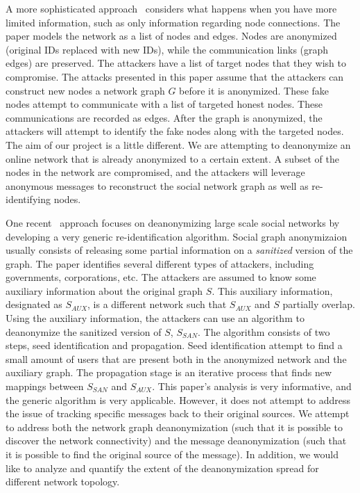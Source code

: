 \documentclass[10pt, twocolumn]{article}
\begin{document}
A more sophisticated approach~\cite{backstrom2007wherefore} considers what happens when you have more limited information, such as only information regarding node connections. The paper models the network as a list of nodes and edges. Nodes are anonymized (original IDs replaced with new IDs), while the communication links (graph edges) are preserved. The attackers have a list of target nodes that they wish to compromise.
The attacks presented in this paper assume that the attackers can construct new nodes a network graph $G$ before it is anonymized. These fake nodes attempt to communicate with a list of targeted honest nodes. These communications are recorded as edges. After the graph is anonymized, the attackers will attempt to identify the fake nodes along with the targeted nodes. 
The aim of our project is a little different. We are attempting to deanonymize an online network that is already anonymized to a certain extent. A subset of the nodes in the network are compromised, and the attackers will leverage anonymous messages to reconstruct the social network graph as well as re-identifying nodes. 

One recent~\cite{narayanan2009anonymizing} approach focuses on deanonymizing large scale social networks by developing a very generic re-identification algorithm. Social graph anonymizaion usually consists of releasing some partial information on a \emph{sanitized} version of the graph. 
The paper identifies several different types of attackers, including governments, corporations, etc. The attackers are assumed to know some auxiliary information about the original graph $S$. This auxiliary information, designated as $S_{AUX}$, is a different network such that $S_{AUX}$ and $S$ partially overlap. Using the auxiliary information, the attackers can use an algorithm to deanonymize the sanitized version of $S$, $S_{SAN}$.
The algorithm consists of two steps, seed identification and propagation. Seed identification attempt to find a small amount of users that are present both in the anonymized network and the auxiliary graph. The propagation stage is an iterative process that finds new mappings between $S_{SAN}$ and $S_{AUX}$. This paper's analysis is very informative, and the generic algorithm is very applicable. However, it does not attempt to address the issue of tracking specific messages back to their original sources. We attempt to address both the network graph deanonymization (such that it is possible to discover the network connectivity) and the message deanonymization (such that it is possible to find the original source of the message). In addition, we would like to analyze and quantify the extent of the deanonymization spread for different network topology.
\end{document}
